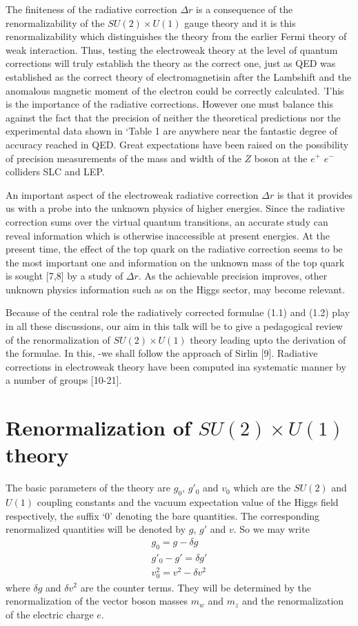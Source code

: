 The finiteness of the radiative correction $\Delta r$ is a consequence of the renormalizability of the $SU(2) \times U(1)$ gauge theory and it is this renormalizability
which distinguishes the theory from the earlier Fermi theory of weak interaction. Thus, testing the electroweak theory at the level of quantum corrections
will truly establish the theory as the correct one, just as QED was established as the correct theory of electromagnetisin after the Lambshift and the anomalous magnetic moment of the electron could be correctly calculated. 'I'his is
the importance of the radiative corrections. However one must balance this
against the fact that the precision of neither the theoretical predictions nor the
experimental data shown in ‘Table 1 are anywhere near the fantastic degree of
accuracy reached in QED. Great expectations have been raised on the possibility of precision measurements of the mass and width of the $Z$ boson at the $e^{+}$ $e^{-}$ colliders SLC and LEP. 

An important aspect of the electroweak radiative correction $\Delta r$ is that it
provides us with a probe into the unknown physics of higher energies. Since
the radiative correction sums over the virtual quantum transitions, an accurate
study can reveal information which is otherwise inaccessible at present energies.
At the present time, the effect of the top quark on the radiative correction seems
to be the most important one and information on the unknown mass of the top
quark is sought [7,8] by a study of $\Delta r$. As the achievable precision improves,
other unknown physics information such as on the Higgs sector, may become
relevant. 

Because of the central role the radiatively corrected formulae (1.1) and (1.2)
play in all these discussions, our aim in this talk will be to give a pedagogical
review of the renormalization of $SU(2) \times U(1)$ theory leading upto the derivation
of the formulae. In this, -we shall follow the approach of Sirlin [9]. Radiative
corrections in electroweak theory have been computed ina systematic manner
by a number of groups [10-21]. 


\section{Renormalization of $SU(2) \times U(1)$ theory }

The basic parameters of the theory are $g_{0}$, $g'_{0}$ and $v_{0}$ which are the $SU(2)$
and $U(1)$ coupling constants and the vacuum expectation value of the Higgs
field respectively, the suffix ‘0’ denoting the bare quantities. The corresponding
renormalized quantities will be denoted by $g$, $g'$ and $v$. So we may write 
\begin{align*}
g_{0} = g-\delta g \tag{2.1}\\
g'_{0} - g' = \delta g'\tag{2.2}\\
v^{2}_{0} = v^{2}-\delta v^{2}\tag{2.3}
\end{align*}
where $\delta g$ and $\delta v^{2}$ are the counter terms. They will be determined by the
renormalization of the vector boson masses $m_{w}$ and $m_{z}$ and the renormalization
of the electric charge $e$. 


